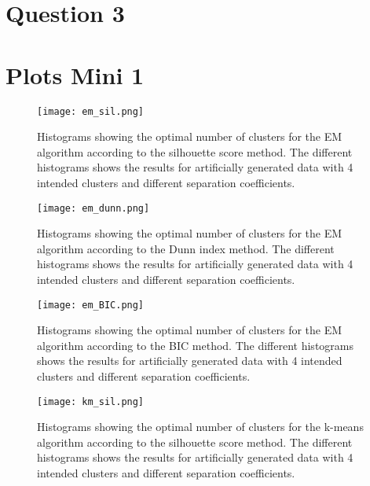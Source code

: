 \documentclass[11pt,twoside,swedish]{article}
\begin{document}
\section{Question 3}\label{Question 3}

\newpage
\appendix

\section{Plots Mini 1}\label{Plots Mini 1}

\graphicspath{{/home/mikael/Repos/Courses/msa220/Mini/Mini/Mini_1/new_plots/}}
\begin{figure}[!htb]
\begin{center}
\texttt{[image: em\_sil.png]}
\caption{Histograms showing the optimal number of clusters for the EM
  algorithm according to the silhouette score method. The different
  histograms shows the results for artificially generated data with 4
  intended clusters and different separation coefficients.}
\label{em_sil_hists}
\end{center}
\end{figure}

\begin{figure}
\begin{center}
\texttt{[image: em\_dunn.png]}
\caption{Histograms showing the optimal number of clusters for the EM
  algorithm according to the Dunn index method. The different
  histograms shows the results for artificially generated data with 4
  intended clusters and different separation coefficients.}
\label{em_dunn_hists}
\end{center}
\end{figure}

\begin{figure}
\begin{center}
\texttt{[image: em\_BIC.png]}
\caption{Histograms showing the optimal number of clusters for the EM
  algorithm according to the BIC method. The different
  histograms shows the results for artificially generated data with 4
  intended clusters and different separation coefficients.}
\label{em_BIC_hists}
\end{center}
\end{figure}

\begin{figure}
\begin{center}
\texttt{[image: km\_sil.png]}
\caption{Histograms showing the optimal number of clusters for the k-means
  algorithm according to the silhouette score method. The different
  histograms shows the results for artificially generated data with 4
  intended clusters and different separation coefficients.}
\label{km_sil_hists}
\end{center}
\end{figure}
\end{document}
